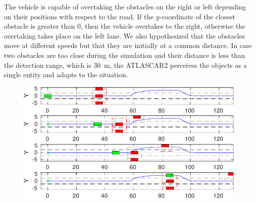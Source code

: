 \documentclass[conference,11pt]{IEEEtran}
\begin{document}
The vehicle is capable of overtaking the obstacles on the right or left depending on their positions with respect to the road. If the $y$-coordinate of the closest obstacle is greater than 0, then the vehicle overtakes to the right, otherwise the overtaking takes place on the left lane. We also hypothesized that the obstacles move at different speeds but that they are initially at a common distance. In case two obstacles are too close during the simulation and their distance is less than the detection range, which is \SI{30}{m}, the ATLASCAR2 perceives the objects as a single entity and adapts to the situation.

\begin{figure}%
	\centering
	\begin{minipage}[t]{\columnwidth}
		\includegraphics[width=1\columnwidth]{./figure/three_obstacles_no_overtaking/braking_0.pdf}
	\end{minipage}
	\begin{minipage}[t]{\columnwidth}
		\includegraphics[width=1\columnwidth]{./figure/three_obstacles_no_overtaking/braking_1.pdf}
	\end{minipage}
	\begin{minipage}[t]{\columnwidth}
		\includegraphics[width=1\columnwidth]{./figure/three_obstacles_no_overtaking/braking_2.pdf}
	\end{minipage}
	\begin{minipage}[t]{\columnwidth}
		\includegraphics[width=1\columnwidth]{./figure/three_obstacles_no_overtaking/braking_4.pdf}

\end{minipage}
\end{figure}
\end{document}
